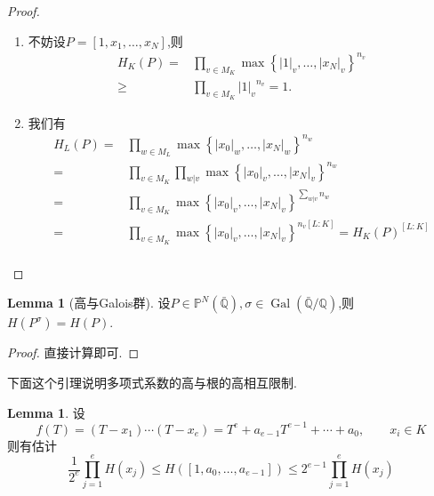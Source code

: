 \documentclass[12pt,A4paper,oneside,reqno]{amsart}
\numberwithin{equation}{section}
\theoremstyle{definition}
\newtheorem{lemma}[theorem]{Lemma}
\theoremstyle{plain}
\theoremstyle{plain}
\numberwithin{equation}{section}
\theoremstyle{remark}
\newcommand{\Gal}{\operatorname{Gal}}
\begin{document}
\begin{proof}\
		\begin{enumerate}[1.]
		\item 不妨设$P=[1,x_1,\ldots,x_N]$,则
		\begin{equation*}
		\begin{aligned}
		H_K(P)=&\prod_{v \in M_K} \max \left\{|1|_v, \ldots , |x_N|_v \right\}^{n_v}\\
		\geqslant & \prod_{v \in M_K}{|1|_v}^{n_v}=1.
		\end{aligned}
		\end{equation*}
		\item 我们有
		\begin{equation*}
		\begin{aligned}
		H_L(P)=&\prod_{w \in M_L} \max \left\{|x_0|_w, \ldots , |x_N|_w \right\}^{n_w}\\
		=&\prod_{v \in M_K}\prod_{w|v} \max \left\{|x_0|_v, \ldots , |x_N|_v \right\}^{n_w}\\
		=&\prod_{v \in M_K} \max \left\{|x_0|_v, \ldots , |x_N|_v \right\}^{\sum_{w | v}n_w}\\
		=&\prod_{v \in M_K} \max \left\{|x_0|_v, \ldots , |x_N|_v \right\}^{n_v[L:K]}=H_K(P)^{[L:K]}\\
		\end{aligned}
		\end{equation*}
	\end{enumerate}
\end{proof}
\begin{lemma}[高与Galois群]\label{lem:Gal&hei}
	设$P \in \mathbb{P}^N(\bar{\mathbb{Q}}), \sigma \in \Gal(\bar{\mathbb{Q}}/\mathbb{Q})$,则$H(P^{\sigma})=H(P)$.
\end{lemma}
\begin{proof}
	直接计算即可.
\end{proof}
下面这个引理说明多项式系数的高与根的高相互限制.
\begin{lemma}\label{lem:poly&hei}
	设
	$$f(T)=(T-x_1) \cdots (T-x_e)=T^e+a_{e-1}T^{e-1}+\cdots +a_0, \qquad x_i \in K$$
	则有估计
	$$\frac{1}{2^e} \prod_{j=1}^{e}H(x_j) \leqslant H([1,a_0, \ldots ,a_{e-1}]) \leqslant 2^{e-1} \prod_{j=1}^{e}H(x_j)$$
\end{lemma}
\end{document}

